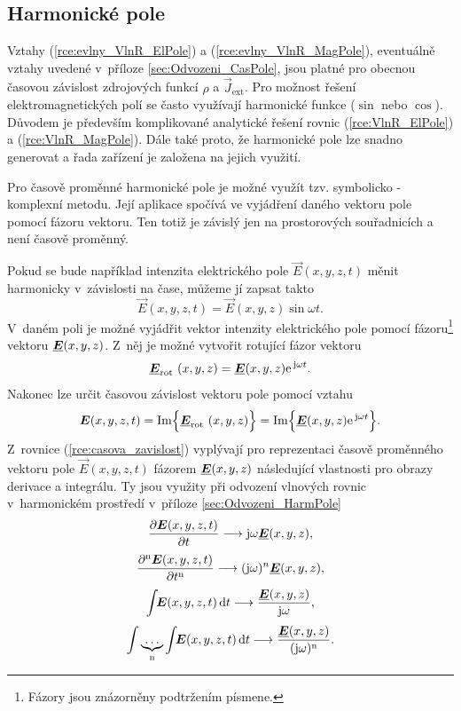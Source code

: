\subsection{Harmonické pole}
Vztahy (\ref{rce:evlny_VlnR_ElPole}) a (\ref{rce:evlny_VlnR_MagPole}), eventuálně vztahy uvedené v~příloze \ref{sec:Odvozeni_CasPole}, jsou platné pro obecnou časovou závislost zdrojových funkcí $\rho$ a $\vec J_{\mathrm{ext}}$. Pro možnost řešení elektromagnetických polí se často využívají harmonické funkce ($\sin$ nebo $\cos$). Důvodem je především komplikované analytické řešení rovnic (\ref{rce:VlnR_ElPole}) a (\ref{rce:VlnR_MagPole}). Dále také proto, že harmonické pole lze snadno generovat a řada zařízení je založena na jejich využití. 

Pro časově proměnné harmonické pole je možné využít tzv. symbolicko - komplexní metodu. Její aplikace spočívá ve vyjádření daného vektoru pole pomocí fázoru vektoru. Ten totiž je závislý jen na prostorových souřadnicích a není časově proměnný.

Pokud se bude například intenzita elektrického pole $\vec E(x,y,z,t)$ měnit harmonicky v~závislosti na čase, můžeme jí zapsat takto
\begin{displaymath}
	\vec E(x,y,z,t) = \vec E(x,y,z)\sin\omega t.
\end{displaymath}
V~daném poli je možné vyjádřit vektor intenzity elektrického pole pomocí fázoru\footnote{Fázory jsou znázorněny podtržením písmene.} vektoru $\mbox{\underline{\boldmath$E$}}(x,y,z)$. Z~něj je možné vytvořit rotující fázor vektoru
\begin{equation}
	\mbox{\underline{\boldmath$E$}}_{\mathrm{rot}\ }(x,y,z) = \mbox{\underline{\boldmath$E$}}(x,y,z)\mathrm{e\,}^{\mathrm{j}\omega t}.
	\label{rce:rotujici_fazor_vektoru}
\end{equation}
Nakonec lze určit časovou závislost vektoru pole pomocí vztahu
\begin{equation}
	\mbox{\boldmath$E$}(x,y,z,t) = \mathrm{Im}\Big\{ \mbox{\underline{\boldmath$E$}}_{\mathrm{rot}\ }(x,y,z)\Big\} = \mathrm{Im}\Big\{ \mbox{\underline{\boldmath$E$}}(x,y,z)\mathrm{e\,}^{\mathrm{j}\omega t}\Big\}.
	\label{rce:casova_zavislost}
\end{equation}
Z~rovnice (\ref{rce:casova_zavislost}) vyplývají pro reprezentaci časově proměnného vektoru pole $\vec E(x,y,z,t)$ fázorem $\mbox{\underline{\boldmath$E$}}(x,y,z)$ následující vlastnosti pro obrazy derivace a integrálu. Ty jsou využity při odvození vlnových rovnic v~harmonickém prostředí v~příloze \ref{sec:Odvozeni_HarmPole}
\begin{displaymath}
	\frac{\partial \mbox{\boldmath$E$}(x,y,z,t)}{\partial t} \longrightarrow \mathrm{j}\omega \mbox{\underline{\boldmath$E$}}(x,y,z),
\end{displaymath}
\begin{displaymath}
	\frac{\partial^{\mathrm{n}} \mbox{\boldmath$E$}(x,y,z,t)}{\partial t^{\mathrm{n}}} \longrightarrow (\mathrm{j}\omega)^{n} \mbox{\underline{\boldmath$E$}}(x,y,z),
\end{displaymath}
\begin{displaymath}
	\int\!\!\mbox{\boldmath$E$}(x,y,z,t) \,\mathrm{d} t \longrightarrow \frac{\mbox{\underline{\boldmath$E$}}(x,y,z)}{\mathrm{j}\omega},
\end{displaymath}
\begin{displaymath}
	\int\underbrace{\ldots}_{\mathrm{n}}\int\!\!\mbox{\boldmath$E$}(x,y,z,t) \,\mathrm{d} t \longrightarrow \frac{\mbox{\underline{\boldmath$E$}}(x,y,z)}{(\mathrm{j}\omega)^{\mathrm{n}}}.
\end{displaymath}

